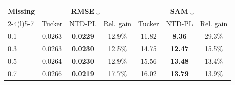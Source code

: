 \setlength{\tabcolsep}{3.0pt}
\begin{tabular}{@{}lcccccc@{}}
\toprule
\multirow{2}{*}{Missing} &
\multicolumn{3}{c}{RMSE$\downarrow$} &
\multicolumn{3}{c}{SAM$\downarrow$} \\
\cmidrule(lr){2-4}\cmidrule(l){5-7}
& Tucker & NTD-PL & Rel. gain & Tucker & NTD-PL & Rel. gain \\
\midrule
0.1 & 0.0263 & \textbf{0.0229} & 12.9\% & 11.82 & \textbf{8.36} & 29.3\% \\
0.3 & 0.0263 & \textbf{0.0230} & 12.5\% & 14.75 & \textbf{12.47} & 15.5\% \\
0.5 & 0.0264 & \textbf{0.0230} & 12.9\% & 15.56 & \textbf{13.48} & 13.4\% \\
0.7 & 0.0266 & \textbf{0.0219} & 17.7\% & 16.02 & \textbf{13.79} & 13.9\% \\
\bottomrule
\end{tabular}
